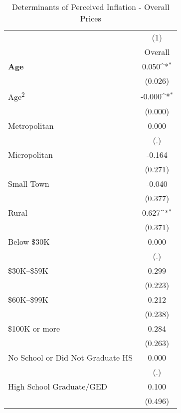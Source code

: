 \begin{table}[htbp]\centering
\def\sym#1{\ifmmode^{#1}\else\(^{#1}\)\fi}
\caption{Determinants of Perceived Inflation - Overall Prices}
\begin{tabular}{l*{1}{c}}
\toprule
                    &\multicolumn{1}{c}{(1)}\\
                    &\multicolumn{1}{c}{Overall}\\
\midrule
\textbf{Age}        &       0.050\sym{*}  \\
                    &     (0.026)         \\
\addlinespace
Age\textsuperscript{2}&      -0.000\sym{*}  \\
                    &     (0.000)         \\
\addlinespace
Metropolitan        &       0.000         \\
                    &         (.)         \\
\addlinespace
Micropolitan        &      -0.164         \\
                    &     (0.271)         \\
\addlinespace
Small Town          &      -0.040         \\
                    &     (0.377)         \\
\addlinespace
Rural               &       0.627\sym{*}  \\
                    &     (0.371)         \\
\addlinespace
Below \$30K         &       0.000         \\
                    &         (.)         \\
\addlinespace
\$30K--\$59K        &       0.299         \\
                    &     (0.223)         \\
\addlinespace
\$60K--\$99K        &       0.212         \\
                    &     (0.238)         \\
\addlinespace
\$100K or more      &       0.284         \\
                    &     (0.263)         \\
\addlinespace
No School or Did Not Graduate HS&       0.000         \\
                    &         (.)         \\
\addlinespace
High School Graduate/GED&       0.100         \\
                    &     (0.496)         \\

\end{tabular}
\end{table}
